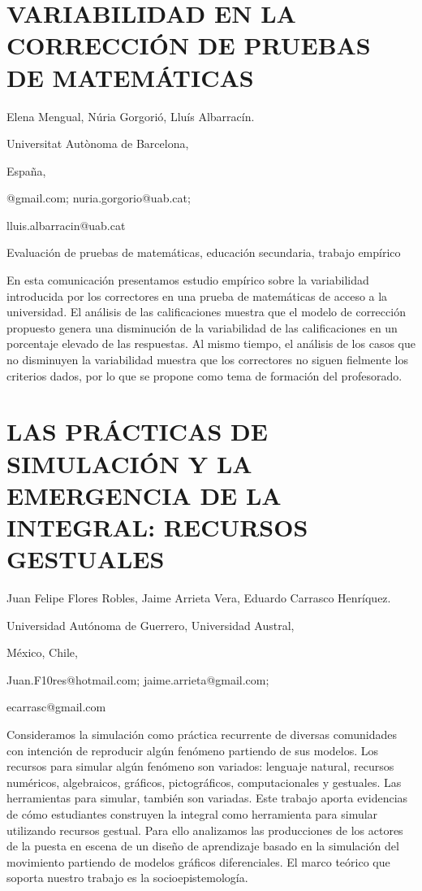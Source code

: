 \section{VARIABILIDAD EN LA CORRECCIÓN DE PRUEBAS DE MATEMÁTICAS }

\begin{datos}

Elena Mengual, Núria Gorgorió, Lluís Albarracín.

Universitat Autònoma de Barcelona,

España,

@gmail.com; nuria.gorgorio@uab.cat;

lluis.albarracin@uab.cat 

\end{datos}

Evaluación de pruebas de matemáticas, educación secundaria, trabajo
empírico

En esta comunicación presentamos estudio empírico sobre la variabilidad
introducida por los correctores en una prueba de matemáticas de acceso
a la universidad. El análisis de las calificaciones muestra que el
modelo de corrección propuesto genera una disminución de la variabilidad
de las calificaciones en un porcentaje elevado de las respuestas.
Al mismo tiempo, el análisis de los casos que no disminuyen la variabilidad
muestra que los correctores no siguen fielmente los criterios dados,
por lo que se propone como tema de formación del profesorado.


\section{LAS PRÁCTICAS DE SIMULACIÓN Y LA EMERGENCIA DE LA INTEGRAL: RECURSOS
GESTUALES}

\begin{datos}

Juan Felipe Flores Robles, Jaime Arrieta Vera, Eduardo Carrasco Henríquez.

Universidad Autónoma de Guerrero, Universidad Austral,

México, Chile,

Juan.F10res@hotmail.com; jaime.arrieta@gmail.com; 

ecarrasc@gmail.com

\end{datos}

Consideramos la simulación como práctica recurrente de diversas comunidades
con intención de reproducir algún fenómeno partiendo de sus modelos.
Los recursos para simular algún fenómeno son variados: lenguaje natural,
recursos numéricos, algebraicos, gráficos, pictográficos, computacionales
y gestuales. Las herramientas para simular, también son variadas.
Este trabajo aporta evidencias de cómo estudiantes construyen la integral
como herramienta para simular utilizando recursos gestual. Para ello
analizamos las producciones de los actores de la puesta en escena
de un diseño de aprendizaje basado en la simulación del movimiento
partiendo de modelos gráficos diferenciales. El marco teórico que
soporta nuestro trabajo es la socioepistemología. 


